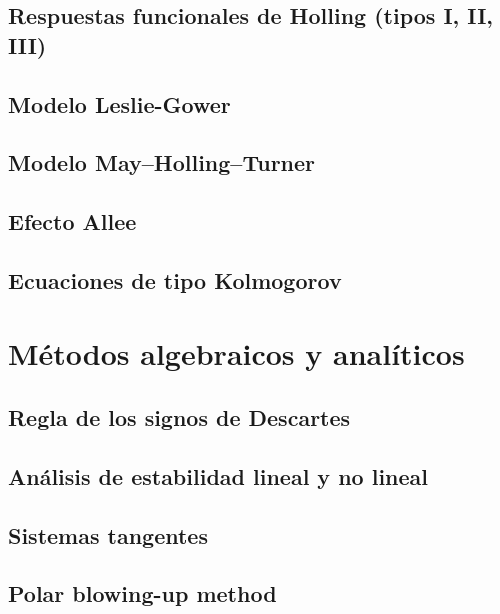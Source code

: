     \subsection{Respuestas funcionales de Holling (tipos I, II, III)}
    \subsection{Modelo Leslie-Gower}
    \subsection{Modelo May–Holling–Turner}
    \subsection{Efecto Allee}
    \subsection{Ecuaciones de tipo Kolmogorov}
    
    \section{Métodos algebraicos y analíticos}
    \subsection{Regla de los signos de Descartes}
    \subsection{Análisis de estabilidad lineal y no lineal}
    \subsection{Sistemas tangentes}
    \subsection{Polar blowing-up method}
    